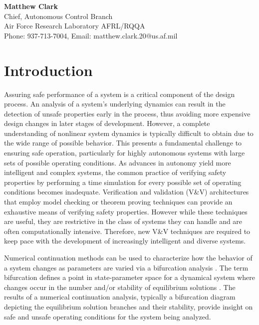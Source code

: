 \documentclass[12pt]{article}
\begin{document}
\begin{center}
\textbf{Matthew Clark}\\Chief, Autonomous Control Branch\\Air Force Research Laboratory AFRL/RQQA\\Phone: 937-713-7004, Email:  matthew.clark.20@us.af.mil
\end{center}

\newpage

\section{Introduction}

Assuring safe performance of a system is a critical component of the design process. An analysis of a system's underlying dynamics can result in the detection of unsafe properties early in the process, thus avoiding more expensive design changes in later stages of development. However, a complete understanding of nonlinear system dynamics is typically difficult to obtain due to the wide range of possible behavior. This presents a fundamental challenge to ensuring safe operation, particularly for highly autonomous systems with large sets of possible operating conditions. As advances in autonomy yield more intelligent and complex systems, the common practice of verifying safety properties by performing a time simulation for every possible set of operating conditions becomes inadequate. Verification and validation (V\&V) architectures that employ model checking or theorem proving techniques can provide an exhaustive means of verifying safety properties. However while these techniques are useful, they are restrictive in the class of systems they can handle and are often computationally intensive. Therefore, new V\&V techniques are required to keep pace with the development of increasingly intelligent and diverse systems. 

Numerical continuation methods can be used to characterize how the behavior of a system changes as parameters are varied via a bifurcation analysis \cite{allgower}. The term bifurcation defines a point in state-parameter space for a dynamical system where changes occur in the number and/or stability of equilibrium solutions \cite{Strogatz}. The results of a numerical continuation analysis, typically a bifurcation diagram depicting the equilibrium solution branches and their stability, provide insight on safe and unsafe operating conditions for the system being analyzed.
\end{document}
